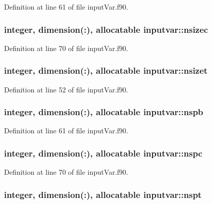 Definition at line 61 of file input\-Var.\-f90.

\hypertarget{classinputvar_af28da5ec88564638bee476f2a37f5308}{
\subsubsection[{nsizec}]{\setlength{\rightskip}{0pt plus 5cm}integer, dimension(\-:), allocatable inputvar\-::nsizec}}\label{classinputvar_af28da5ec88564638bee476f2a37f5308}


Definition at line 70 of file input\-Var.\-f90.

\hypertarget{classinputvar_ad358835680a10ce32616f8262e7dea05}{
\subsubsection[{nsizet}]{\setlength{\rightskip}{0pt plus 5cm}integer, dimension(\-:), allocatable inputvar\-::nsizet}}\label{classinputvar_ad358835680a10ce32616f8262e7dea05}


Definition at line 52 of file input\-Var.\-f90.

\hypertarget{classinputvar_aa1e78ecd4b3cbb3f08b770cf604a5d3d}{
\subsubsection[{nspb}]{\setlength{\rightskip}{0pt plus 5cm}integer, dimension(\-:), allocatable inputvar\-::nspb}}\label{classinputvar_aa1e78ecd4b3cbb3f08b770cf604a5d3d}


Definition at line 61 of file input\-Var.\-f90.

\hypertarget{classinputvar_aad6ce13b0378ba79e193cb3738e2d938}{
\subsubsection[{nspc}]{\setlength{\rightskip}{0pt plus 5cm}integer, dimension(\-:), allocatable inputvar\-::nspc}}\label{classinputvar_aad6ce13b0378ba79e193cb3738e2d938}


Definition at line 70 of file input\-Var.\-f90.

\hypertarget{classinputvar_a0c86e9a7915872ee547e5bd8802611e7}{
\subsubsection[{nspt}]{\setlength{\rightskip}{0pt plus 5cm}integer, dimension(\-:), allocatable inputvar\-::nspt}}\label{classinputvar_a0c86e9a7915872ee547e5bd8802611e7}


